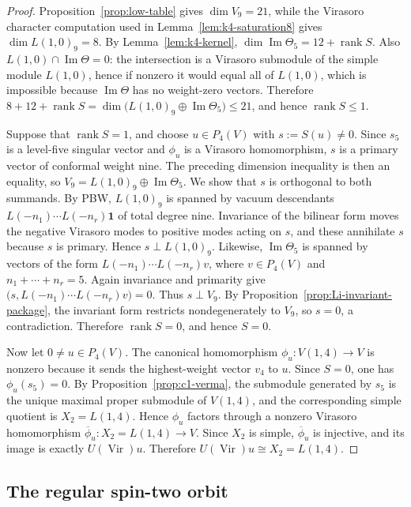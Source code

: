 \documentclass[10pt,a4paper]{amsart}
\numberwithin{equation}{section} \newtheorem{thm}{Theorem}[section] \newtheorem{lem}[thm]{Lemma} \newtheorem{ex}[thm]{Example} \newtheorem{prop}[thm]{Proposition} \newtheorem{cor}[thm]{Corollary} \newtheorem{defi}[thm]{Definition} \newtheorem{rmk}[thm]{Remark} \newtheorem{notation}[thm]{Notation}
\newcommand{\one}{\mathbf{1}}
\newcommand{\Vir}{\operatorname{Vir}}
\begin{document}
\begin{proof}
Proposition~\ref{prop:low-table} gives $\dim V_9=21$, while the Virasoro character computation used in Lemma~\ref{lem:k4-saturation8} gives $\dim L(1,0)_9=8$. By Lemma~\ref{lem:k4-kernel}, \(\dim\operatorname{Im}\Theta_5=12+\operatorname{rank}S\). Also \(L(1,0)\cap\operatorname{Im}\Theta=0\): the intersection is a Virasoro submodule of the simple module $L(1,0)$, hence if nonzero it would equal all of $L(1,0)$, which is impossible because $\operatorname{Im}\Theta$ has no weight-zero vectors. Therefore \(8+12+\operatorname{rank}S =\dim\bigl(L(1,0)_9\oplus\operatorname{Im}\Theta_5\bigr) \le21\), and hence $\operatorname{rank}S\le1$.

Suppose that $\operatorname{rank}S=1$, and choose $u\in P_4(V)$ with $s:=S(u)\ne0$. Since $s_5$ is a level-five singular vector and $\phi_u$ is a Virasoro homomorphism, $s$ is a primary vector of conformal weight nine. The preceding dimension inequality is then an equality, so \(V_9=L(1,0)_9\oplus\operatorname{Im}\Theta_5.\) We show that $s$ is orthogonal to both summands. By PBW, $L(1,0)_9$ is spanned by vacuum descendants \(L(-n_1)\cdots L(-n_r)\one\) of total degree nine. Invariance of the bilinear form moves the negative Virasoro modes to positive modes acting on $s$, and these annihilate $s$ because $s$ is primary. Hence \(s\perp L(1,0)_9\). Likewise, $\operatorname{Im}\Theta_5$ is spanned by vectors of the form \(L(-n_1)\cdots L(-n_r)v\), where $v\in P_4(V)$ and $n_1+\cdots+n_r=5$. Again invariance and primarity give \(\bigl(s,L(-n_1)\cdots L(-n_r)v\bigr)=0.\) Thus $s\perp V_9$. By Proposition~\ref{prop:Li-invariant-package}, the invariant form restricts nondegenerately to $V_9$, so $s=0$, a contradiction. Therefore $\operatorname{rank}S=0$, and hence $S=0$.

Now let $0\ne u\in P_4(V)$. The canonical homomorphism \(\phi_u:V(1,4)\to V\) is nonzero because it sends the highest-weight vector $v_4$ to $u$. Since $S=0$, one has $\phi_u(s_5)=0$. By Proposition~\ref{prop:c1-verma}, the submodule generated by $s_5$ is the unique maximal proper submodule of $V(1,4)$, and the corresponding simple quotient is $X_2=L(1,4)$. Hence $\phi_u$ factors through a nonzero Virasoro homomorphism \(\overline\phi_u:X_2=L(1,4)\longrightarrow V.\) Since $X_2$ is simple, $\overline\phi_u$ is injective, and its image is exactly $U(\Vir)u$. Therefore \(U(\Vir)u\cong X_2=L(1,4)\).
\end{proof}

\subsection{The regular spin-two orbit}
\end{document}
